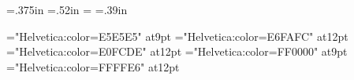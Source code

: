 \let\imagefloat\relax
\let\imagecaption\relax

\let\remfor\relax
\let\Hhhhh\relax

\def\unames{\eight\rm}

\def\ofs#1#2#3{}
\let\ofspc\pcxxv

\def\ccchr{\pcssxx}
\def\ccuni{\helvx}

\def\beginchartlist{\begin{2column}\offinterlineskip} %
\def\endchartlist{\end{2column}\vfil\supereject}

\def\cclrow#1#2#3{%
        \vbox{\hsize3.2in\parindent0pt
              \hbox to 3.2in{%
              \hbox to .4in{\helvy#1\hfil}%
              \hbox to .4in{\pcssxx#2\hss}%
              \hbox to 2.4in{\hsize2.4in\vtop{\par\helvy\leavevmode\rightskip0pt plus1fil\relax#3\endgraf}}%
                            \hfil}}\vfil}
\def\cclnum#1{{\helv#1}}
\def\cclchr{\redpc}%
\def\ccluni{\Sans\eight\rm}

\let\twocol\relax

\let\glyf\relax
\let\fchr\relax
\let\fhex\relax
\let\dist\relax
\let\rhex\relax

\newdimen\ccwd \ccwd=.375in\relax
\newdimen\ccht \ccht=.52in\relax
\newdimen\cccwd \cccwd=\ccwd\relax
\newdimen\cccht \cccht=.39in\relax

\newdimen\cdliwd \cdliwd=2.75pc
\newdimen\slcwd \slcwd=3.65pc
\def\slcc{\pcssxxx}
\def\slcu{\helvy}

\def\slnocdli{\vbox{\hbox to\cdliwd{\hfil}\vfil}}
\def\slnodist{\vbox{\hbox to1in{\hfil}\vfil}}
\def\slnoglyf{\vbox{\hbox to\slcwd{\hfil}\vfil}}

\def\tbodyrule{\noalign{\hrule\vskip3pt plus1pt minus1pt}\noalign{\allowbreak}}

\def\notcovrule{\noalign{\kern2pt\hrule height.2pt\vskip3pt plus1pt minus1pt}\noalign{\allowbreak}}

\def\tbodybreak{\noalign{\allowbreak}}

\def\sltabrule{\noalign{\hrule\vskip3pt plus1pt minus1pt}}


\font\hveee="Helvetica:color=E5E5E5" at9pt
\font\hveff="Helvetica:color=E6FAFC" at12pt
\font\hvefd="Helvetica:color=E0FCDE" at12pt
\font\hvfee="Helvetica:color=FF0000" at9pt
\font\hvffe="Helvetica:color=FFFFE6" at12pt

